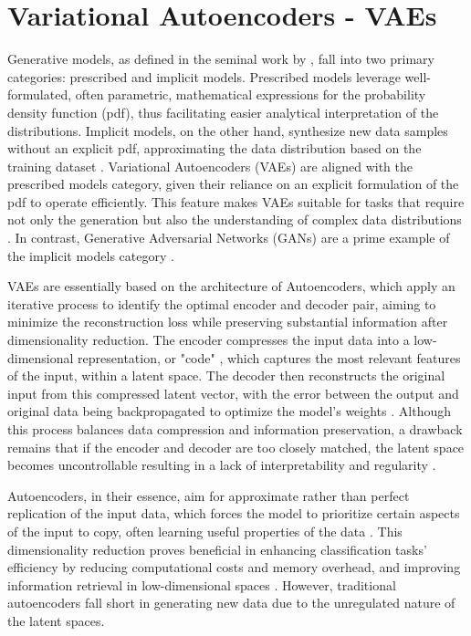 \section{Variational Autoencoders - VAEs}
\label{VAEs}

Generative models, as defined in the seminal work by \citeauthor{diggleImplicitPrescribed}, fall into two primary categories: prescribed and implicit models. Prescribed models leverage well-formulated, often parametric, mathematical expressions for the probability density function (pdf), thus facilitating easier analytical interpretation of the distributions. Implicit models, on the other hand, synthesize new data samples without an explicit pdf, approximating the data distribution based on the training dataset \citep{diggleImplicitPrescribed}. Variational Autoencoders (VAEs) are aligned with the prescribed models category, given their reliance on an explicit formulation of the pdf to operate efficiently. This feature makes VAEs suitable for tasks that require not only the generation but also the understanding of complex data distributions \citep{kingmaVAE,rezendeVAE,GoodfellowDeepLearning}. In contrast, Generative Adversarial Networks (GANs) are a prime example of the implicit models category \citep{goodfellowGAN}.

VAEs are essentially based on the architecture of Autoencoders, which apply an iterative process to identify the optimal encoder and decoder pair, aiming to minimize the reconstruction loss while preserving substantial information after dimensionality reduction. The encoder compresses the input data into a low-dimensional representation, or "code" \citep{hintonCode, GoodfellowDeepLearning}, which captures the most relevant features of the input, within a latent space. The decoder then reconstructs the original input from this compressed latent vector, with the error between the output and original data being backpropagated to optimize the model’s weights \citep{GoodfellowDeepLearning, michelucci2022introduction}. Although this process balances data compression and information preservation, a drawback remains that if the encoder and decoder are too closely matched, the latent space becomes uncontrollable resulting in a lack of interpretability and regularity \citep{michelucci2022introduction}.

Autoencoders, in their essence, aim for approximate rather than perfect replication of the input data, which forces the model to prioritize certain aspects of the input to copy, often learning useful properties of the data \citep{GoodfellowDeepLearning}. This dimensionality reduction proves beneficial in enhancing classification tasks' efficiency by reducing computational costs and memory overhead, and improving information retrieval in low-dimensional spaces \citep{GoodfellowDeepLearning}. However, traditional autoencoders fall short in generating new data due to the unregulated nature of the latent spaces.

